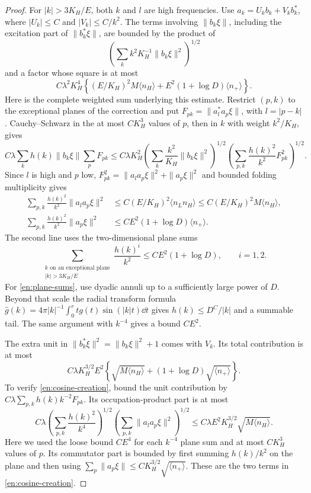 \begin{proof}
For $|k|>3K_H/E$, both $k$ and $l$ are high frequencies.  Use
$a_k=U_kb_k+V_kb_k^*$, where $|U_k|\le C$ and $|V_k|\le C/k^2$.
The terms involving $\|b_k\xi\|$, including the excitation part of
$\|b_k^*\xi\|$, are bounded by the product of
\[
 \left(\sum_k k^2K_H^{-1}\|b_k\xi\|^2\right)^{1/2}
\]
and a factor whose square is at most
\begin{equation}\label{en:cosine-high}
 C\lambda^2K_H^4\left\{
 (E/K_H)^2M\langle n_H\rangle
       +E^2(1+\log D)\langle n_+\rangle\right\}.
\end{equation}
Here is the complete weighted sum underlying this estimate.  Restrict
$(p,k)$ to the exceptional planes of the correction and put
$F_{pk}=\|a_l^*a_p\xi\|$, with $l=|p-k|$.
Cauchy--Schwarz in the at most $CK_H^3$ values of $p$, then in $k$
with weight $k^2/K_H$, gives
\[
 C\lambda\sum_k h(k)\|b_k\xi\|\sum_pF_{pk}
 \le C\lambda K_H^2
 \left(\sum_k\frac{k^2}{K_H}\|b_k\xi\|^2\right)^{1/2}
 \left(\sum_{p,k}\frac{h(k)^2}{k^2}F_{pk}^2\right)^{1/2}.
\]
Since $l$ is high and $p$ low,
$F_{pk}^2=\|a_la_p\xi\|^2+\|a_p\xi\|^2$ and bounded folding
multiplicity gives
\begin{align*}
 \sum_{p,k}\frac{h(k)^2}{k^2}\|a_la_p\xi\|^2
       &\le C(E/K_H)^2\langle n_Ln_H\rangle
        \le C(E/K_H)^2M\langle n_H\rangle,\\
 \sum_{p,k}\frac{h(k)^2}{k^2}\|a_p\xi\|^2
       &\le CE^2(1+\log D)\langle n_+\rangle.
\end{align*}
The second line uses the two-dimensional plane sums
\begin{equation}\label{en:plane-sums}
 \sum_{\substack{k\text{ on an exceptional plane}\\|k|>3K_H/E}}
       \frac{h(k)^i}{k^2}\le CE^2(1+\log D),\qquad i=1,2.
\end{equation}
For \eqref{en:plane-sums}, use dyadic annuli up to a sufficiently large
power of $D$.  Beyond that scale the radial transform formula
$\widehat g(k)=4\pi|k|^{-1}\int_0^r t g(t)\sin(|k|t)\dd t$
gives $h(k)\le D^C/|k|$ and a summable tail.  The same argument with
$k^{-4}$ gives a bound $CE^2$.

The extra unit in $\|b_k^*\xi\|^2=\|b_k\xi\|^2+1$ comes with $V_k$.
Its total contribution is at most
\begin{equation}\label{en:cosine-creation}
 C\lambda K_H^{3/2}E^2
       \left\{\sqrt{M\langle n_H\rangle}
                 +(1+\log D)\sqrt{\langle n_+\rangle}\right\}.
\end{equation}
To verify \eqref{en:cosine-creation}, bound the unit contribution by
$C\lambda\sum_{p,k}h(k)k^{-2}F_{pk}$.
Its occupation-product part is at most
\[
 C\lambda
 \left(\sum_{p,k}\frac{h(k)^2}{k^4}\right)^{1/2}
 \left(\sum_{p,k}\|a_la_p\xi\|^2\right)^{1/2}
 \le C\lambda E^2K_H^{3/2}\sqrt{M\langle n_H\rangle}.
\]
Here we used the loose bound $CE^4$ for each $k^{-4}$ plane sum
and at most $CK_H^3$ values of $p$.
Its commutator part is bounded by first summing
$h(k)/k^2$ on the plane and then using
$\sum_p\|a_p\xi\|\le CK_H^{3/2}\sqrt{\langle n_+\rangle}$.
These are the two terms in \eqref{en:cosine-creation}.


\end{proof}
